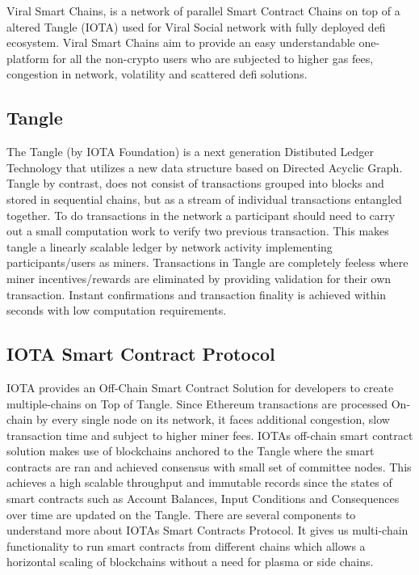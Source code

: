 \documentclass[10pt]{article}
\begin{document}
Viral Smart Chains, is a network of parallel Smart Contract Chains on top of a altered Tangle (IOTA) used for Viral Social network with fully deployed defi ecosystem. Viral Smart Chains aim to provide an easy understandable one-platform for all the non-crypto users who are subjected to higher gas fees, congestion in network, volatility and scattered defi solutions. \\

\subsection{Tangle}

The Tangle (by IOTA Foundation) is a next generation Distibuted Ledger Technology that utilizes a new data structure based on Directed Acyclic Graph. Tangle by contrast, does not consist of transactions grouped into blocks and stored in sequential chains, but as a stream of individual transactions entangled together. To do transactions in the network a participant should need to carry out a small computation work to verify two previous transaction. This makes tangle a linearly scalable ledger by network activity implementing participants/users as miners. Transactions in Tangle are completely feeless where miner incentives/rewards are eliminated by providing validation for their own transaction. Instant confirmations and transaction finality is achieved within seconds with low computation requirements.

\subsection{IOTA Smart Contract Protocol}

IOTA provides an Off-Chain Smart Contract Solution for developers to create multiple-chains on Top of Tangle. Since Ethereum transactions are processed On-chain by every single node on its network, it faces additional congestion, slow transaction time and subject to higher miner fees. IOTA\textsc{}s off-chain smart contract solution makes use of blockchains anchored to the Tangle where the smart contracts are ran and achieved consensus with small set of committee nodes. This achieves a high scalable throughput and immutable records since the states of smart contracts such as Account Balances, Input Conditions and Consequences over time are updated on the Tangle. There are several components to understand more about IOTA\textsc{}s Smart Contracts Protocol. It gives us multi-chain functionality to run smart contracts from different chains which allows a horizontal scaling of blockchains without a need for plasma or side chains.\\
\end{document}
